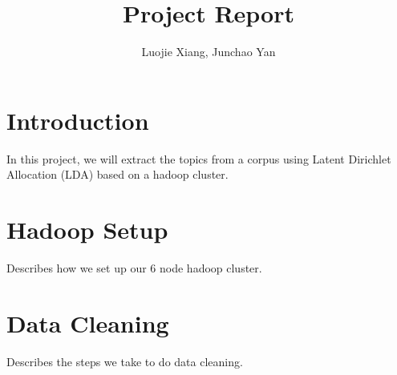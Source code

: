 \documentclass{article}
\begin{document}
\title{Project Report}
\author{Luojie Xiang, Junchao Yan}
\date{}
\maketitle

\section{Introduction}
In this project, we will extract the topics from a corpus using Latent Dirichlet Allocation (LDA) based on a hadoop cluster.  
\section{Hadoop Setup}

Describes how we set up our 6 node hadoop cluster.

\section{Data Cleaning}

Describes the steps we take to do data cleaning.
\end{document}
